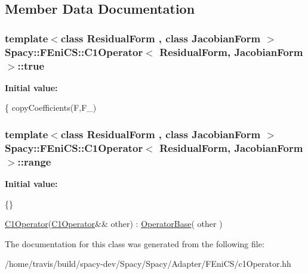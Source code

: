 \subsection{Member Data Documentation}
\hypertarget{classSpacy_1_1FEniCS_1_1C1Operator_a3e824a103e6dcbd210453e41473e201a}{
\subsubsection[{true}]{\setlength{\rightskip}{0pt plus 5cm}template$<$class Residual\-Form , class Jacobian\-Form $>$ {\bf Spacy\-::\-F\-Eni\-C\-S\-::\-C1\-Operator}$<$ Residual\-Form, Jacobian\-Form $>$\-::true}}\label{classSpacy_1_1FEniCS_1_1C1Operator_a3e824a103e6dcbd210453e41473e201a}
{\bfseries Initial value\-:}
\begin{DoxyCode}
\{
        copyCoefficients(F,F\_)
\end{DoxyCode}
\hypertarget{classSpacy_1_1FEniCS_1_1C1Operator_a03b12bc6ffa2f3e5dc2a7ccf6db2eb82}{
\subsubsection[{range}]{\setlength{\rightskip}{0pt plus 5cm}template$<$class Residual\-Form , class Jacobian\-Form $>$ {\bf Spacy\-::\-F\-Eni\-C\-S\-::\-C1\-Operator}$<$ Residual\-Form, Jacobian\-Form $>$\-::range}}\label{classSpacy_1_1FEniCS_1_1C1Operator_a03b12bc6ffa2f3e5dc2a7ccf6db2eb82}
{\bfseries Initial value\-:}
\begin{DoxyCode}
\{\}

      \hyperlink{classSpacy_1_1FEniCS_1_1C1Operator_a3e578031e731cad3f4fa8b7364f8ec97}{C1Operator}(\hyperlink{classSpacy_1_1FEniCS_1_1C1Operator_a3e578031e731cad3f4fa8b7364f8ec97}{C1Operator}&& other)
        : \hyperlink{classSpacy_1_1OperatorBase_a0e61c53f3dc6088609701c022410841c}{OperatorBase}( other )
\end{DoxyCode}


The documentation for this class was generated from the following file\-:\begin{DoxyCompactItemize}
\item 
/home/travis/build/spacy-\/dev/\-Spacy/\-Spacy/\-Adapter/\-F\-Eni\-C\-S/c1\-Operator.\-hh\end{DoxyCompactItemize}
